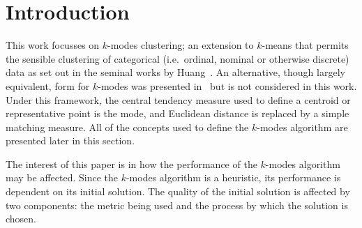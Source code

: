 \section{Introduction}\label{sec:intro}


This work focusses on \(k\)-modes clustering; an extension to
\(k\)-means that permits the sensible clustering of categorical (i.e.\ ordinal,
nominal or otherwise discrete) data as set out in the seminal works by
Huang~\cite{Huang1997a,Huang1997b,Huang1998}. An alternative, though largely
equivalent, form for \(k\)-modes was presented in~\cite{Chaturvedi2001} but is
not considered in this work. Under this framework, the central tendency measure
used to define a centroid or representative point is the mode, and Euclidean
distance is replaced by a simple matching measure. All of the concepts used to
define the \(k\)-modes algorithm are presented later in this section.

The interest of this paper is in how the performance of the \(k\)-modes
algorithm may be affected. Since the \(k\)-modes algorithm is a heuristic, its
performance is dependent on its initial solution. The quality of the initial
solution is affected by two components: the metric being used and the process by
which the solution is chosen.


